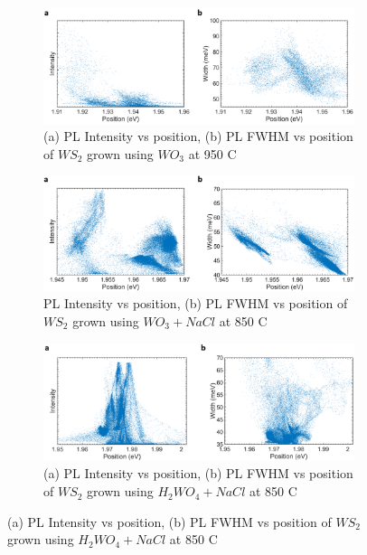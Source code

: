 \documentclass[12pt]{article}
\begin{document}
\begin{figure}[!h]
	\begin{center}
		\begin{subfigure}[b]{0.8\textwidth}
			\includegraphics[scale=0.3]{PaperSIScatterWO3.png}
			\caption{(a) PL Intensity vs position, (b) PL FWHM vs position of $WS_2$ grown using $WO_3$ at 950 {\degree}C}
			\label{fig:PaperSIScatterWO3}
		\end{subfigure}

		\begin{subfigure}[b]{0.8\textwidth}
			\includegraphics[scale=0.3]{PaperSIScatterWO3NaCl.png}
			\caption{PL Intensity vs position, (b) PL FWHM vs position of $WS_2$ grown using $WO_3+NaCl$ at 850 {\degree}C}
			\label{fig:PaperSIScatterWO3NaCl}
		\end{subfigure}

		\begin{subfigure}[b]{0.8\textwidth}
			\includegraphics[scale=0.3]{PaperSIScatterH2WO4NaCl.png}
			\caption{(a) PL Intensity vs position, (b) PL FWHM vs position of $WS_2$ grown using $H_2WO_4+NaCl$ at 850 {\degree}C}
			\label{fig:PaperSIScatterH2WO4NaCl}
		\end{subfigure}


\end{center}
\end{figure}
\end{document}
